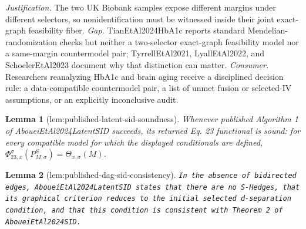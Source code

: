 \documentclass{article}
\newtheorem{lemma}{Lemma}
\begin{document}
\par\smallskip\noindent \textit{Justification.} The two UK Biobank samples expose different margins under different selectors, so nonidentification must be witnessed inside their joint exact-graph feasibility fiber. \textit{Gap.} TianEtAl2024HbA1c reports standard Mendelian-randomization checks but neither a two-selector exact-graph feasibility model nor a same-margin countermodel pair; TyrrellEtAl2021, LyallEtAl2022, and SchoelerEtAl2023 document why that distinction can matter. \textit{Consumer.} Researchers reanalyzing HbA1c and brain aging receive a disciplined decision rule: a data-compatible countermodel pair, a list of unmet fusion or selected-IV assumptions, or an explicitly inconclusive audit.

\begin{lemma}[lem:published-latent-sid-soundness]\label{lem:published-latent-sid-soundness}
Whenever published Algorithm 1 of AboueiEtAl2024LatentSID succeeds, its returned Eq. 23 functional is sound: for every compatible model for which the displayed conditionals are defined, \(\Phi_{23,x}^{\sigma}(P_{M,\sigma}^S)=\Theta_{x,\sigma}(M)\).
\end{lemma}

\begin{lemma}[lem:published-dag-sid-consistency]\label{lem:published-dag-sid-consistency}
\texttt{In the absence of bidirected edges,\allowbreak{} AboueiEtAl2024LatentSID states that there are no S-\allowbreak{}Hedges,\allowbreak{} that its graphical criterion reduces to the initial selected d-\allowbreak{}separation condition,\allowbreak{} and that this condition is consistent with Theorem 2 of AboueiEtAl2024SID.}
\end{lemma}
\end{document}

